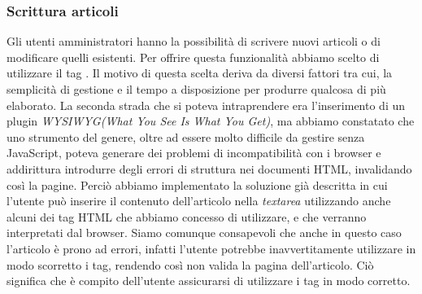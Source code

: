 \documentclass[12pt]{article}
\begin{document}
	\subsubsection{Scrittura articoli}
	Gli utenti amministratori hanno la possibilità di scrivere nuovi articoli o di modificare quelli esistenti. Per offrire questa funzionalità abbiamo scelto di utilizzare il tag \emph{}. Il motivo di questa scelta deriva da diversi fattori tra cui, la semplicità di gestione e il tempo a disposizione per produrre qualcosa di più elaborato. La seconda strada che si poteva intraprendere era l'inserimento di un plugin \emph{WYSIWYG(What You See Is What You Get)}, ma abbiamo constatato che uno strumento del genere, oltre ad essere molto difficile da gestire senza JavaScript, poteva generare dei problemi di incompatibilità con i browser e addirittura introdurre degli errori di struttura nei documenti HTML, invalidando così la pagine. Perciò abbiamo implementato la soluzione già descritta in cui l'utente può inserire il contenuto dell'articolo nella \emph{textarea} utilizzando anche alcuni dei tag HTML che abbiamo concesso di utilizzare, e che verranno interpretati dal browser. Siamo comunque consapevoli che anche in questo caso l'articolo è prono ad errori, infatti l'utente potrebbe inavvertitamente utilizzare in modo scorretto i tag, rendendo così non valida la pagina dell'articolo. Ciò significa che è compito dell'utente assicurarsi di utilizzare i tag in modo corretto.
\end{document}

